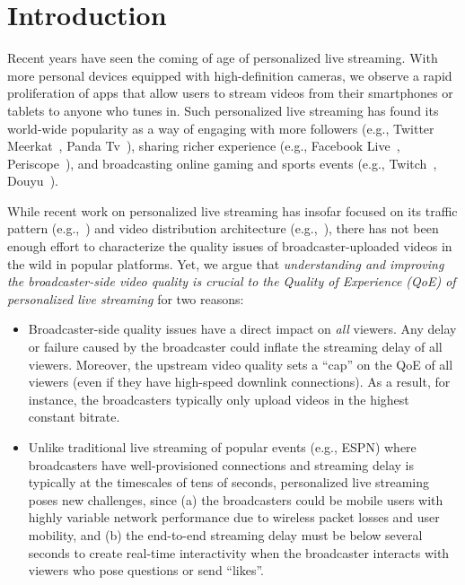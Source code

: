\section{Introduction}
Recent years have seen the coming of age of personalized live
streaming. With more personal devices equipped with high-definition
cameras, we observe a rapid proliferation of apps that allow users
to stream videos from their smartphones or tablets to anyone who
tunes in. Such personalized live streaming has found its world-wide
popularity as a way of engaging with more followers (e.g., Twitter 
Meerkat~\cite{twitter}, Panda Tv~\cite{panda}),
sharing richer experience (e.g., Facebook Live~\cite{facebook}, Periscope~\cite{periscope}),
and broadcasting online gaming and sports events (e.g., Twitch~\cite{twitch}, Douyu~\cite{douyu}).


While recent work on personalized live streaming has insofar 
focused on its traffic pattern (e.g.,~\cite{zhang2015crowdsourced,tang2016meerkat})
and video distribution architecture (e.g.,~\cite{siekkinen2016first,wang2016anatomy}),
there has not been enough effort to characterize the 
quality issues of broadcaster-uploaded videos in the wild in popular platforms.
Yet, we argue that {\em understanding and improving the broadcaster-side
video quality is crucial to the Quality of Experience (QoE) of personalized 
live streaming} for two reasons:
\begin{itemize}
\item Broadcaster-side quality issues
have a direct impact on {\em all} viewers.
Any delay or failure caused by the broadcaster could inflate the
streaming delay of all viewers. Moreover, the upstream video quality
sets a ``cap'' on the QoE of all
viewers (even if they have high-speed downlink connections).
As a result, for instance, the broadcasters typically only upload 
videos in the highest constant bitrate.
\item Unlike traditional live streaming of popular events
(e.g., ESPN) where broadcasters have well-provisioned
connections and streaming delay is typically at the timescales 
of tens of seconds,
personalized live streaming poses new challenges, since 
(a) the broadcasters could be mobile users with highly variable
network performance due to wireless packet losses and
user mobility, and
(b) the end-to-end streaming delay must be below several seconds 
to create real-time interactivity when
the broadcaster interacts with viewers who pose questions
or send ``likes''.
\end{itemize}

